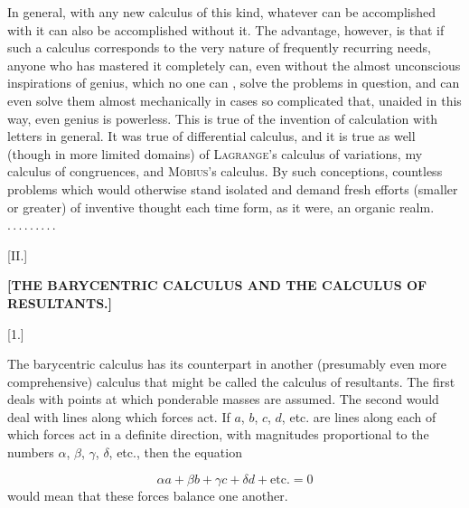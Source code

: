 \par{}
\indent In general, with any new calculus of this kind, whatever can be accomplished with it
can also be accomplished without it. The advantage, however, is
that if such a calculus corresponds to the very nature of frequently recurring
needs, anyone who has mastered it completely can, even without the
almost unconscious inspirations of genius, which no one can , solve the
problems in question, and can even solve them almost mechanically in cases so complicated
that, unaided in this way, even genius is powerless. This is true of
the invention of calculation with letters in general. It was true of differential calculus,
and it is true as well (though in more limited domains) of \textsc{Lagrange}'s
calculus of variations, my calculus of congruences, and \textsc{Möbius}'s calculus. By
such conceptions, countless problems which would otherwise stand isolated and
demand fresh efforts (smaller or greater) of inventive thought each time
form, as it were, an organic realm. \mbox{.\,.\,.\,.\,.\,.\,.\,.\,.}

\begin{center}
\medskip

[II.]

\textbf{[THE BARYCENTRIC CALCULUS AND THE CALCULUS OF RESULTANTS.]}

[1.]
\end{center}

The barycentric calculus has its counterpart in another (presumably even
more comprehensive) calculus that might be called the calculus of resultants. The first deals
with points at which ponderable masses are assumed. The second would deal
with lines along which forces act. If $a$, $b$, $c$,
$d$, etc. are lines along each of which forces act in a definite direction, with magnitudes
proportional to the numbers $\alpha$, $\beta$, $\gamma$, $\delta$, etc., then
the equation

\[
\alpha a + \beta b + \gamma c + \delta d + \text{etc.} = 0
\]
\noindent would mean that these forces balance one another.
